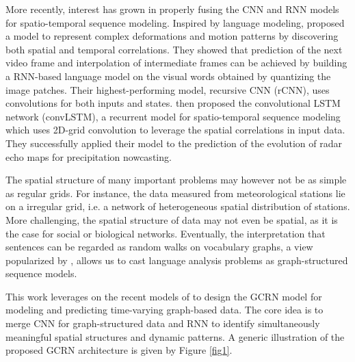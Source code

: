 \documentclass{article} %
\newcommand{\todo}[1]{{\color{red} #1 }}
\begin{document}
More recently, interest has grown in properly fusing the CNN and RNN models for
spatio-temporal sequence modeling. Inspired by language modeling,
\citet{video_language_model} proposed a model to represent complex deformations
and motion patterns by discovering both spatial and temporal correlations. They showed that prediction of the next video frame and
interpolation of intermediate frames can be achieved by building a RNN-based
language model on the visual words obtained by quantizing the image patches.
Their highest-performing model, recursive CNN (rCNN), uses convolutions for both
 inputs and states. \citet{convlstm}  then proposed the convolutional
LSTM network (convLSTM), a recurrent model for spatio-temporal sequence
modeling which uses 2D-grid convolution to leverage the spatial correlations in
input data. They successfully applied their model to the prediction of the
evolution of radar echo maps for precipitation nowcasting.



The spatial structure of many important problems may however not be as simple as regular grids. For instance, 
the data measured from meteorological stations lie on a irregular grid, i.e. a network of heterogeneous spatial
distribution of stations. More challenging, the spatial structure of data may not even be spatial, as it is the case for social or biological networks. Eventually, the interpretation that sentences can be regarded as random walks on vocabulary graphs,
a view popularized by \cite{word2vec}, allows us to cast language analysis problems as graph-structured sequence models.

This work leverages on the recent models of \cite{gcnn,video_language_model,convlstm} to design the GCRN model for modeling and predicting time-varying graph-based data. The core idea is to merge CNN for graph-structured data and RNN to identify simultaneously meaningful spatial structures and dynamic patterns. A generic illustration of the proposed GCRN architecture is given by Figure \ref{fig1}.


\end{document}
